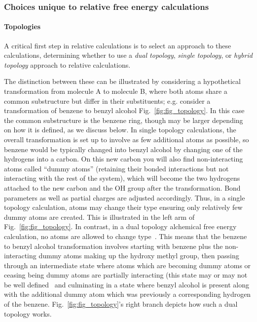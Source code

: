 \documentclass[9pt,bestpractices]{livecoms}
\begin{document}
\subsubsection{Choices unique to relative free energy calculations}
\label{sec:relative-fe-protocol}

\paragraph{Topologies} 
A critical first step in relative calculations is to select an approach to these calculations, determining whether to use a \emph{dual topology}, \emph{single topology}, or \emph{hybrid topology} approach to relative calculations.

The distinction between these can be illustrated by considering a hypothetical transformation from molecule A to molecule B, where both atoms share a common substructure but differ in their substituents; e.g. consider a transformation of benzene to benzyl alcohol Fig.~\ref{fig:fig_topology}.
In this case the common substructure is the benzene ring, though may be larger depending on how it is defined, as we discuss below.
In single topology calculations, the overall transformation is set up to involve as few additional atoms as possible, so benzene would be typically changed into benzyl alcohol by changing one of the hydrogens into a carbon. On this new carbon you will also find non-interacting atoms called ``dummy atoms'' (retaining their bonded interactions but not interacting with the rest of the system), which will become the two hydrogens attached to the new carbon and the OH group after the transformation. Bond parameters as well as partial charges are adjusted accordingly. 
Thus, in a single topology calculation, atoms may change their type ensuring only relatively few dummy atoms are created. This is illustrated in the left arm of Fig.~\ref{fig:fig_topology}. 
In contrast, in a dual topology alchemical free energy calculation, no atoms are allowed to change type~\cite{shirts2012best}. This means that the benzene to benzyl alcohol transformation involves starting with benzene plus the non-interacting dummy atoms making up the hydroxy methyl group, then passing through an intermediate state where atoms which are becoming dummy atoms or ceasing being dummy atoms are partially interacting (this state may or may not be well defined~\cite{mobley2014blind}  and culminating in a state where benzyl alcohol is present along with the additional dummy atom which was previously a corresponding hydrogen of the benzene. Fig.~\ref{fig:fig_topology}'s right branch depicts how such a dual topology works. 
\end{document}
